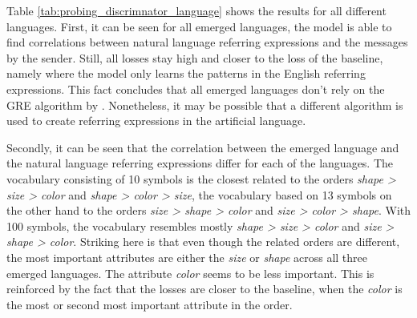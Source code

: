 Table \ref{tab:probing_discrimnator_language} shows the results for all different languages.
First, it can be seen for all emerged languages, the model is able to find correlations between natural language referring expressions and the messages by the sender.
Still, all losses stay high and closer to the loss of the baseline, namely where the model only learns the patterns in the English referring expressions.
This fact concludes that all emerged languages don't rely on the GRE algorithm by \citet{Dale1995}.
Nonetheless, it may be possible that a different algorithm is used to create referring expressions in the artificial language.

Secondly, it can be seen that the correlation between the emerged language and the natural language referring expressions differ for each of the languages.
The vocabulary consisting of 10 symbols is the closest related to the orders \emph{shape > size > color} and \emph{shape > color > size}, the vocabulary based on 13 symbols on the other hand to the orders \emph{size > shape > color} and \emph{size > color > shape}.
With 100 symbols, the vocabulary resembles mostly \emph{shape > size > color} and \emph{size > shape > color}.
Striking here is that even though the related orders are different, the most important attributes are either the \emph{size} or \emph{shape} across all three emerged languages.
The attribute \emph{color} seems to be less important.
This is reinforced by the fact that the losses are closer to the baseline, when the \emph{color} is the most or second most important attribute in the order.

